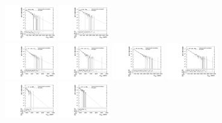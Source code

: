 \begin{figure}[htbp]
  \includegraphics[width=0.2\textwidth]{fig/analysisAppendix/templateVsReco_res_r0_MVV_mu_LP_bb_HDy.pdf}
  \includegraphics[width=0.2\textwidth]{fig/analysisAppendix/templateVsReco_res_r0_MVV_e_LP_bb_HDy.pdf}\\
  \includegraphics[width=0.2\textwidth]{fig/analysisAppendix/templateVsReco_res_r0_MVV_mu_HP_nobb_HDy.pdf}
  \includegraphics[width=0.2\textwidth]{fig/analysisAppendix/templateVsReco_res_r0_MVV_e_HP_nobb_HDy.pdf}
  \includegraphics[width=0.2\textwidth]{fig/analysisAppendix/templateVsReco_res_r0_MVV_mu_LP_nobb_HDy.pdf}
  \includegraphics[width=0.2\textwidth]{fig/analysisAppendix/templateVsReco_res_r0_MVV_e_LP_nobb_HDy.pdf}\\
  \includegraphics[width=0.2\textwidth]{fig/analysisAppendix/templateVsReco_res_r0_MVV_mu_HP_vbf_HDy.pdf}
  \includegraphics[width=0.2\textwidth]{fig/analysisAppendix/templateVsReco_res_r0_MVV_e_HP_vbf_HDy.pdf}

\end{figure}
